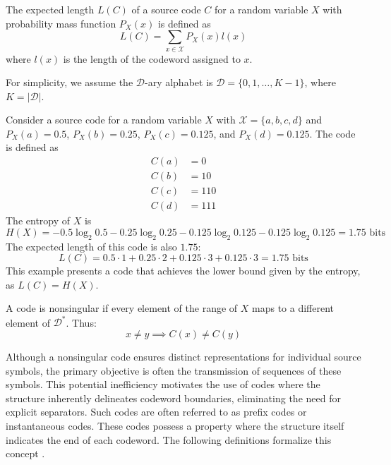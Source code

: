 \begin{definition}\label{def:expected_length}
    The expected length $L(C)$ of a source code $C$ for a random variable $X$ with probability mass function $P_X(x)$ is defined as
    \begin{equation*}
        L(C) = \sum_{x\in\mathcal{X}} P_X(x)l(x)
    \end{equation*}
    where $l(x)$ is the length of the codeword assigned to $x$.
\end{definition}

\noindent For simplicity, we assume the $\mathcal{D}$-ary alphabet is $\mathcal{D} = \{0, 1, \ldots, K-1\}$, where $K=|\mathcal{D}|$.

\begin{example}\label{ex:source_code}
    Consider a source code for a random variable $X$ with $\mathcal{X} = \{a, b, c, d\}$ and $P_X(a) = 0.5$, $P_X(b) = 0.25$, $P_X(c) = 0.125$, and $P_X(d) = 0.125$. The code is defined as
    \begin{align*}
        C(a) & = 0   \\
        C(b) & = 10  \\
        C(c) & = 110 \\
        C(d) & = 111
    \end{align*}
    The entropy of $X$ is
    \begin{equation*}
        H(X) = -0.5\log_2 0.5 - 0.25\log_2 0.25 - 0.125\log_2 0.125 - 0.125\log_2 0.125 = 1.75 \text{ bits}
    \end{equation*}
    The expected length of this code is also $1.75$:
    \begin{equation*}
        L(C) = 0.5 \cdot 1 + 0.25 \cdot 2 + 0.125 \cdot 3 + 0.125 \cdot 3 = 1.75 \text{ bits}
    \end{equation*}
    This example presents a code that achieves the lower bound given by the entropy, as $L(C) = H(X)$.
\end{example}

\begin{definition}\label{def:nonsingular_code}
    A code is nonsingular if every element of the range of $X$ maps to a different element of $\mathcal{D}^*$. Thus:
    \begin{equation*}
        x \neq y \implies C(x) \neq C(y)
    \end{equation*}
\end{definition}

\noindent Although a nonsingular code ensures distinct representations for individual source symbols, the primary objective is often the transmission of sequences of these symbols. This potential inefficiency motivates the use of codes where the structure inherently delineates codeword boundaries, eliminating the need for explicit separators. Such codes are often referred to as prefix codes or instantaneous codes. These codes possess a property where the structure itself indicates the end of each codeword. The following definitions formalize this concept \cite{ElementsofInformationTheory}.

